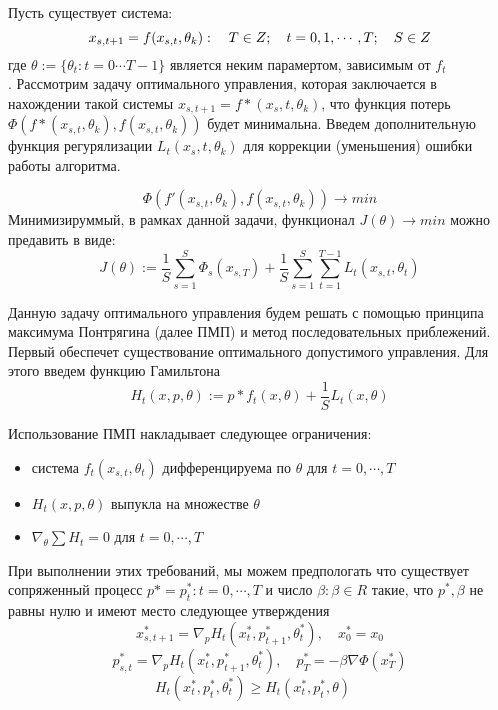 \documentclass{article}
\begin{document}
Пусть существует система:
\begin{equation}
x_{s,t+1} = f(x_{s,t}, \theta_k): \quad T \in Z; \quad t=0,1,\cdots ,T; \quad S \in Z\\ 
\end{equation}
где $ \theta := \{\theta_t : t = 0\cdots T - 1 \}$ является неким парамертом, зависимым от $f_t$\\.
Рассмотрим задачу оптимального управления, которая заключается в нахождении такой системы $x_{s,t+1} = f*(x_s,t, \theta_k)$, что функция потерь
   \\ $\Phi(f*(x_{s,t}, \theta_k),f(x_{s,t}, \theta_k))$
будет минимальна. Введем дополнительную функция регурялизации $L_t(x_s,t, \theta_k)$ для коррекции (уменьшения) ошибки работы алгоритма.  

\begin{equation}
    \Phi(f'(x_{s,t}, \theta_k),f(x_{s,t}, \theta_k))\rightarrow min
\end{equation}
Минимизируммый, в рамках данной задачи, функционал $J (\theta)\rightarrow min$ можно предавить в виде:
\begin{equation}
    J(\theta):=\frac1S\sum\limits_{s=1}^S \Phi_s(x_{s,T})+ \frac1S\sum\limits_{s=1}^S\sum\limits_{t=1}^{T-1} L_t(x_{s,t},\theta_t)
\end{equation}


Данную задачу оптимального управления будем решать с помощью принципа максимума Понтрягина (далее ПМП) и метод последовательных приблежений. Первый обеспечет существование оптимального допустимого управления. Для этого введем функцию Гамильтона
\begin{equation}
    H_t(x,p,\theta):= p*f_t(x,\theta)+ \frac1S L_t(x,\theta)
\end{equation}

Использование ПМП накладывает следующее ограничения:
\begin{itemize}
\item система $f_t(x_{s,t},\theta_t)$ дифференцируема по $\theta$ для $t=0,\cdots,T$ 
\item $H_t(x,p,\theta)$ выпукла на множестве $\theta$  
\item $\nabla_\theta \sum H_t=0$ для  $t=0,\cdots,T$
\end{itemize}
При выполнении этих требований, мы можем предпологать что существует сопряженный процесс $p*={p_t^*:t=0,\cdots,T}$ и число $\beta: \beta \in R$ такие, что ${p^*,\beta}$ не равны нулю и имеют место следующее утверждения
\begin{equation}
    x_{s,t+1}^* = \nabla_p H_t(x_t^*,p_{t+1}^*,\theta_t^*), \quad
    x_0^* = x_0
\end{equation}
\begin{equation}
    p_{s,t}^* = \nabla_p H_t( x_{t}^*, p_{t+1}^*, \theta_t^*),  \quad
    p_{T}^* = -\beta \nabla \Phi(x_{T}^*)
\end{equation}
\begin{equation}
    H_t(x_t^*,p_{t}^*,\theta_t^*)\geq H_t(x_t^*,p_{t}^*,\theta) \quad
\end{equation}
\end{document}
